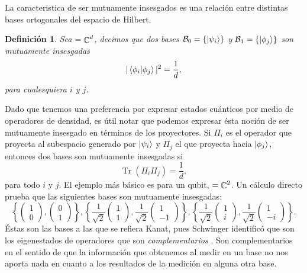 \documentclass[a4paper]{report}
\DeclareMathOperator{\C}{\mathbb{C}}
\let\H\relax
\DeclareMathOperator{\H}{\mathcal H}
\DeclareMathOperator{\Tr}{Tr}
\newtheorem{definition}{Definición}
\begin{document}
  La caracteristica de ser mutuamente insesgados es una
  relación entre distintas bases ortogonales del espacio de
  Hilbert.
  \begin{definition}
    Sea $\H = \C^{d}$, decimos que dos bases
    $\mathcal B_0 = \{\ket{\psi_i}\}$ y $\mathcal B_1 =
    \{\ket{\phi_j}\}$ son mutuamente insesgadas
    \begin{equation}
      |\braket{\phi_i|\phi_j}|^2
      = \frac{1}{d},
    \end{equation} 
    para cualesquiera $i$ y $j$.
  \end{definition}
  Dado que tenemos una preferencia por expresar estados
  cuánticos por medio de operadores de densidad, es útil
  notar que podemos expresar ésta noción de ser mutuamente
  insesgado en términos de los proyectores. Si $\Pi_i$ es el
  operador que proyecta al subespacio generado por
  $\ket{\psi_i}$ y $\Pi_j$ el que proyecta hacia
  $\ket{\phi_j}$, entonces dos bases son mutuamente
  insesgadas si
  \begin{equation}
    \Tr\left( \Pi_i \Pi_j \right) 
    = \frac{1}{d},
  \end{equation}
  para todo $i$ y $j$. El ejemplo más básico es para un
  qubit, $\H = \C^2$.  Un cálculo directo prueba que las
  siguientes bases son mutuamente insesgadas:
  \begin{equation}
    \left\{
      \begin{pmatrix} 1\\0 \end{pmatrix},
      \begin{pmatrix} 0\\1 \end{pmatrix}
    \right\},
    \left\{
      \frac{1}{\sqrt{2}} \begin{pmatrix} 1\\1 \end{pmatrix},
      \frac{1}{\sqrt{2}} \begin{pmatrix} 1\\-1 \end{pmatrix}
    \right\},
    \left\{
      \frac{1}{\sqrt{2}} \begin{pmatrix} 1\\i \end{pmatrix},
      \frac{1}{\sqrt{2}} \begin{pmatrix} 1\\-i \end{pmatrix}
    \right\}.
  \end{equation}
  Éstas son las bases a las que se refiera Kanat, pues
  Schwinger identificó que son los eigenestados de
  operadores que son \textit{complementarios}
  \cite{wootters1989}. Son complementarios en el sentido de
  que la información que obtenemos al medir en un base no
  nos aporta nada en cuanto a los resultados de la medición
  en alguna otra base.
\end{document}
